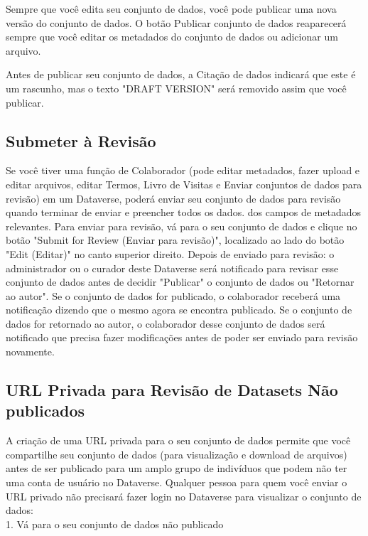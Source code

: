\documentclass[12pt,hidelinks]{article}
\begin{document}
Sempre que você edita seu conjunto de dados, você pode publicar uma nova versão do conjunto de dados. O botão Publicar conjunto de dados reaparecerá sempre que você editar os metadados do conjunto de dados ou adicionar um arquivo.

Antes de publicar seu conjunto de dados, a Citação de dados indicará que este é um rascunho, mas o texto "DRAFT VERSION" será removido assim que você publicar.
    
    \subsection{Submeter à Revisão}
    
\qquad Se você tiver uma função de Colaborador (pode editar metadados, fazer upload e editar arquivos, editar Termos, Livro de Visitas e Enviar conjuntos de dados para revisão) em um Dataverse, poderá enviar seu conjunto de dados para revisão quando terminar de enviar e preencher todos os dados. dos campos de metadados relevantes. Para enviar para revisão, vá para o seu conjunto de dados e clique no botão "Submit for Review (Enviar para revisão)", localizado ao lado do botão "Edit (Editar)" no canto superior direito. Depois de enviado para revisão: o administrador ou o curador deste Dataverse será notificado para revisar esse conjunto de dados antes de decidir "Publicar" o conjunto de dados ou "Retornar ao autor". Se o conjunto de dados for publicado, o colaborador receberá uma notificação dizendo que o mesmo agora se encontra publicado. Se o conjunto de dados for retornado ao autor, o colaborador desse conjunto de dados será notificado que precisa fazer modificações antes de poder ser enviado para revisão novamente.
    
    \subsection{URL Privada para Revisão de Datasets Não publicados}
    
\qquad A criação de uma URL privada para o seu conjunto de dados permite que você compartilhe seu conjunto de dados (para visualização e download de arquivos) antes de ser publicado para um amplo grupo de indivíduos que podem não ter uma conta de usuário no Dataverse. Qualquer pessoa para quem você enviar o URL privado não precisará fazer login no Dataverse para visualizar o conjunto de dados:\\

1. Vá para o seu conjunto de dados não publicado\\
\end{document}
